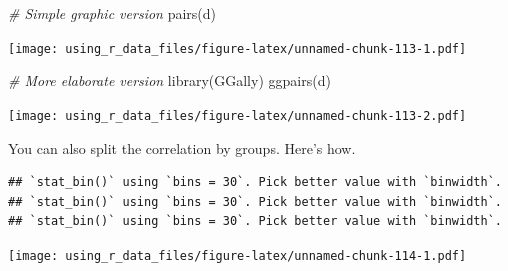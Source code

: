 \documentclass[
]{book}
\newenvironment{Shaded}{\begin{snugshade}}{\end{snugshade}}
\newcommand{\AttributeTok}[1]{\textcolor[rgb]{0.77,0.63,0.00}{#1}}
\newcommand{\CommentTok}[1]{\textcolor[rgb]{0.56,0.35,0.01}{\textit{#1}}}
\newcommand{\ConstantTok}[1]{\textcolor[rgb]{0.00,0.00,0.00}{#1}}
\newcommand{\DecValTok}[1]{\textcolor[rgb]{0.00,0.00,0.81}{#1}}
\newcommand{\FunctionTok}[1]{\textcolor[rgb]{0.00,0.00,0.00}{#1}}
\newcommand{\NormalTok}[1]{#1}
\newcommand{\OtherTok}[1]{\textcolor[rgb]{0.56,0.35,0.01}{#1}}
\newcommand{\SpecialCharTok}[1]{\textcolor[rgb]{0.00,0.00,0.00}{#1}}
\newcommand{\StringTok}[1]{\textcolor[rgb]{0.31,0.60,0.02}{#1}}
\begin{document}
\begin{Shaded}
\begin{Highlighting}[]
\CommentTok{\# Simple graphic version}
\FunctionTok{pairs}\NormalTok{(d)}
\end{Highlighting}
\end{Shaded}

\texttt{[image: using\_r\_data\_files/figure-latex/unnamed-chunk-113-1.pdf]}

\begin{Shaded}
\begin{Highlighting}[]
\CommentTok{\# More elaborate version}
\FunctionTok{library}\NormalTok{(GGally)}
\FunctionTok{ggpairs}\NormalTok{(d)}
\end{Highlighting}
\end{Shaded}

\texttt{[image: using\_r\_data\_files/figure-latex/unnamed-chunk-113-2.pdf]}

You can also split the correlation by groups. Here's how.

\begin{Shaded}
\end{Shaded}

\begin{verbatim}
## `stat_bin()` using `bins = 30`. Pick better value with `binwidth`.
## `stat_bin()` using `bins = 30`. Pick better value with `binwidth`.
## `stat_bin()` using `bins = 30`. Pick better value with `binwidth`.
\end{verbatim}

\texttt{[image: using\_r\_data\_files/figure-latex/unnamed-chunk-114-1.pdf]}
\end{document}
